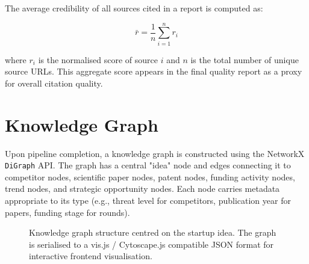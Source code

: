 \documentclass[12pt,a4paper,oneside]{book}
\begin{document}
The average credibility of all sources cited in a report is computed as:

\begin{equation}
  \bar{r} = \frac{1}{n} \sum_{i=1}^{n} r_i
\end{equation}

where $r_i$ is the normalised score of source $i$ and $n$ is the total number of unique source URLs. This aggregate score appears in the final quality report as a proxy for overall citation quality.

\section{Knowledge Graph}
\label{sec:kg}

Upon pipeline completion, a knowledge graph is constructed using the NetworkX \texttt{DiGraph} API. The graph has a central "idea" node and edges connecting it to competitor nodes, scientific paper nodes, patent nodes, funding activity nodes, trend nodes, and strategic opportunity nodes. Each node carries metadata appropriate to its type (e.g., threat level for competitors, publication year for papers, funding stage for rounds).

\begin{figure}[H]
\centering
{}
\caption{Knowledge graph structure centred on the startup idea. The graph is serialised to a vis.js / Cytoscape.js compatible JSON format for interactive frontend visualisation.}
\label{fig:knowledge_graph}
\end{figure}
\end{document}
